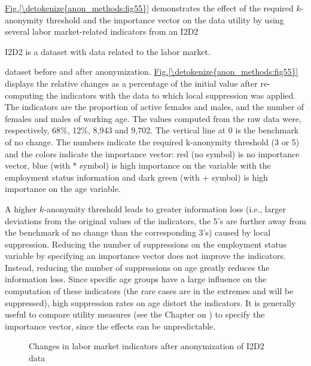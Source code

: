 \documentclass[letterpaper,10pt,english]{sphinxmanual}
\begin{document}
\hyperref[\detokenize{anon_methods:fig55}]{Fig.\@ \ref{\detokenize{anon_methods:fig55}}} demonstrates the effect of the required \(k\)-anonymity
threshold and the importance vector on the data utility by using several
labor market-related indicators from an I2D2 %
\begin{footnote}[8]\sphinxAtStartFootnote
I2D2 is a dataset with data related to the labor market.
%
\end{footnote}
dataset before and after anonymization. \hyperref[\detokenize{anon_methods:fig55}]{Fig.\@ \ref{\detokenize{anon_methods:fig55}}} displays the relative
changes as a percentage of the initial value after re-computing the
indicators with the data to which local suppression was applied. The
indicators are the proportion of active females and males, and the
number of females and males of working age. The values computed from the
raw data were, respectively, 68\%, 12\%, 8,943 and 9,702. The vertical
line at 0 is the benchmark of no change. The numbers indicate the
required k-anonymity threshold (3 or 5) and the colors indicate the
importance vector: red (no symbol) is no importance vector, blue (with
* symbol) is high importance on the variable with the employment status
information and dark green (with + symbol) is high importance on the age
variable.

A higher \(k\)-anonymity threshold leads to greater information loss
(i.e., larger deviations from the original values of the indicators, the
5’s are further away from the benchmark of no change than the
corresponding 3’s) caused by local suppression. Reducing the number of
suppressions on the employment status variable by specifying an
importance vector does not improve the indicators. Instead, reducing the
number of suppressions on age greatly reduces the information loss.
Since specific age groups have a large influence on the computation of
these indicators (the rare cases are in the extremes and will be
suppressed), high suppression rates on age distort the indicators. It is
generally useful to compare utility measures (see the Chapter on
 ) to specify
the importance vector, since the effects can be unpredictable.

\begin{figure}[htbp]
\centering
\capstart

\noindent{}
\caption{Changes in labor market indicators after anonymization of I2D2 data}\label{\detokenize{anon_methods:fig55}}\label{\detokenize{anon_methods:id31}}\end{figure}
\end{document}
